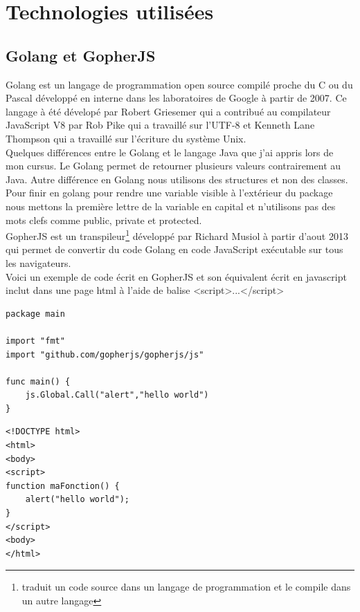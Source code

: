 \documentclass[12pt,a4paper]{report}
\begin{document}
\section{Technologies utilisées}
\subsection{Golang et GopherJS}
Golang est un langage de programmation open source compilé proche du C ou du Pascal  développé en interne dans les laboratoires de Google à partir de 2007. Ce langage à été dévelopé par Robert Griesemer qui a contribué au compilateur JavaScript V8 par Rob Pike qui a travaillé sur l'UTF-8 et Kenneth Lane Thompson qui a travaillé sur l'écriture du système Unix.\\

Quelques différences entre le Golang et le langage Java que j'ai appris lors de mon cursus. Le Golang permet de retourner plusieurs valeurs contrairement au Java. Autre différence en Golang nous utilisons des structures et non des classes. Pour finir en golang pour rendre une variable visible à l'extérieur du package nous mettons la première lettre de la variable en capital et n'utilisons pas des mots clefs comme public, private et protected.\\

GopherJS est un transpileur\footnote{traduit un code source dans un langage de programmation et le compile dans un autre langage} développé par Richard Musiol à partir d'aout 2013 qui permet de convertir du code Golang en code JavaScript exécutable sur tous les navigateurs.\\



\newpage
Voici un exemple de code écrit en GopherJS et son équivalent écrit en javascript inclut dans une page html à l'aide de balise <script>...</script>\\
\lstset{style=Golang}
\begin{lstlisting}
package main

import "fmt"
import "github.com/gopherjs/gopherjs/js"

func main() {
    js.Global.Call("alert","hello world")
}
\end{lstlisting}

\lstset{style=HTML5}
\begin{lstlisting}
<!DOCTYPE html>
<html>
<body>
<script>
function maFonction() {
	alert("hello world");
}
</script>
<body>
</html>
\end{lstlisting}
\end{document}
